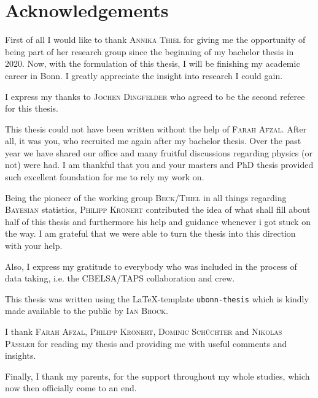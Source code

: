 \chapter*{Acknowledgements}
\label{sec:ack}

\noindent First of all I would like to thank \textsc{Annika Thiel} for giving me the opportunity of being part of her research group since the beginning of my bachelor thesis in 2020. Now, with the formulation of this thesis, I will be finishing my academic career in Bonn. I greatly appreciate the insight into research I could gain.
\vspace{1cm}

\noindent I express my thanks to \textsc{Jochen Dingfelder} who agreed to be the second referee for this thesis.
\vspace{1cm}

\noindent This thesis could not have been written without the help of \textsc{Farah Afzal}. After all, it was you, who recruited me again after my bachelor thesis. Over the past year we have shared our office and many fruitful discussions regarding physics (or not) were had. I am thankful that you and your masters and PhD thesis provided such excellent foundation for me to rely my work on.
\vspace{1cm}

\noindent Being the pioneer of the working group \textsc{Beck/Thiel} in all things regarding \textsc{Bayesian} statistics, \textsc{Philipp Krönert} contributed the idea of what shall fill about half of this thesis and furthermore his help and guidance whenever i got stuck on the way. I am grateful that we were able to turn the thesis into this direction with your help.
\vspace{1cm}

\noindent Also, I express my gratitude to everybody who was included in the process of data taking, i.e. the CBELSA/TAPS collaboration and crew.
\vspace{1cm}

\noindent This thesis was written using the \LaTeX-template \texttt{ubonn-thesis} which is kindly made available to the public by \textsc{Ian Brock}.  
\vspace{1cm}

\noindent I thank \textsc{Farah Afzal, Philipp Krönert, Dominic Schüchter} and \textsc{Nikolas Pässler} for reading my thesis and providing me with useful comments and insights.
\vspace{1cm}

\noindent Finally, I thank my parents, for the support throughout my whole studies, which now then officially come to an end. 

   


